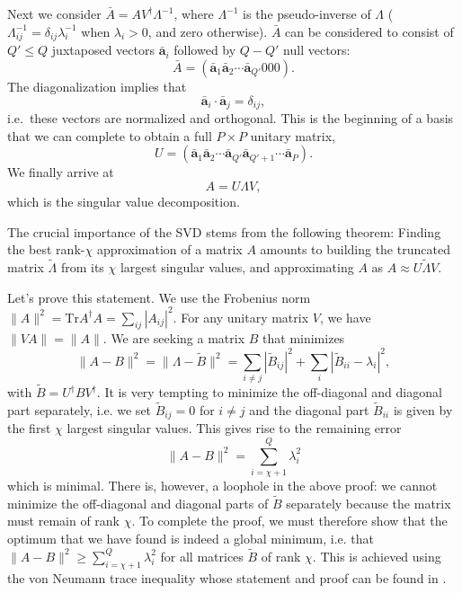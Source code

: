 \documentclass{SciPost}
\begin{document}
Next we consider $\bar A =  A V^\dagger \Lambda^{-1}$, where $\Lambda^{-1}$ is the pseudo-inverse of
$\Lambda$ ($\Lambda_{ij}^{-1} = \delta_{ij} \lambda_i^{-1}$ when $\lambda_i>0$, and zero otherwise). $\bar A$ can be considered to consist of $Q'\le Q$ juxtaposed vectors
$\mathbf{\bar a}_i$ followed by $Q-Q'$ null vectors:
\begin{equation}
\bar A = \left(\mathbf{\bar a}_1 \mathbf{\bar a}_2\cdots{}\mathbf{\bar a}_{Q'} 0 0 0\right).
\end{equation}
The diagonalization implies that
\begin{equation}
\mathbf{\bar a}_i\cdot \mathbf{\bar a}_j =\delta_{ij},
\end{equation}
i.e.\ these vectors are normalized and orthogonal. This is the beginning of a basis
that we can complete to obtain a full $P\times P$ unitary matrix,
\begin{equation}
U = \left(\mathbf{\bar a}_1 \mathbf{\bar a}_2\cdots{}\mathbf{\bar a}_{Q'} \mathbf{\bar a}_{Q'+1}
\cdots{}\mathbf{\bar a}_{P}
\right).
\end{equation}
We finally arrive at
\begin{equation}
A = U \Lambda V,
\end{equation}
which is the singular value decomposition.

The crucial importance of the SVD stems from the following theorem:
Finding the best rank-$\chi$ approximation of a matrix $A$ amounts to building the
truncated matrix $\tilde \Lambda$ from its $\chi$ largest singular values,
and approximating $A$ as $A\approx U \tilde\Lambda V$.

Let's prove this statement. We use the Frobenius norm
$\| A \|^2 = \text{Tr} A^\dagger A = \sum_{ij} |A_{ij}|^2$. For any unitary matrix $V$,
we have $\| VA \| = \| A \|$. We are seeking a matrix $B$ that minimizes
\begin{equation}
\| A - B\|^2 = \| \Lambda - \tilde B \|^2  = \sum_{i\ne j} |\tilde B_{ij}|^2
+ \sum_{i} |\tilde B_{ii} -\lambda_i |^2,
\end{equation}
with $\tilde B = U^\dagger B V^\dagger$. 
It is very tempting to minimize the off-diagonal and diagonal part
separately, i.e. we set $\tilde B_{ij}=0$ for $i\ne j$ and the diagonal part $\tilde B_{ii}$ is given by the first $\chi$ largest singular values. This gives rise to the remaining error
\begin{equation}
\| A - B\|^2 = \sum_{i=\chi+1}^Q \lambda_i^2
\end{equation}
which is minimal. There is, however, a loophole in the above proof: we cannot minimize
the off-diagonal and diagonal parts of $\tilde B$ separately because the matrix must remain of rank $\chi$. To complete the proof, we must therefore show that the optimum that we have found is indeed a global minimum, i.e. that
$\| A - B\|^2 \ge \sum_{i=\chi+1}^Q \lambda_i^2$ for all matrices $\tilde B$ of rank $\chi$. This is achieved using the von Neumann trace inequality whose statement and proof can be found in \cite{mirsky1975}.
\end{document}

